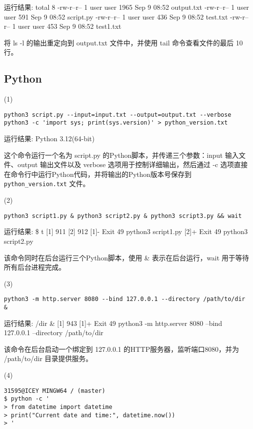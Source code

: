 \documentclass[a4paper, 12pt]{article}
\begin{document}
运行结果:
{\color{blue}
total 8
-rw-r--r-- 1 user user 1965 Sep  9 08:52 output.txt
-rw-r--r-- 1 user user  591 Sep  9 08:52 script.py
-rw-r--r-- 1 user user  436 Sep  9 08:52 test.txt
-rw-r--r-- 1 user user  453 Sep  9 08:52 test1.txt
}

将 ls -l 的输出重定向到 output.txt 文件中，并使用 tail 命令查看文件的最后 10 行。

\subsection{Python}
(1)\begin{verbatim}
python3 script.py --input=input.txt --output=output.txt --verbose
python3 -c 'import sys; print(sys.version)' > python_version.txt
\end{verbatim}

运行结果:
{\color{blue}
Python 3.12(64-bit)
}

这个命令运行一个名为 script.py 的Python脚本，并传递三个参数：input 输入文件、output 输出文件以及 verbose 选项用于控制详细输出，然后通过 -c 选项直接在命令行中运行Python代码，并将输出的Python版本号保存到 \texttt{python\_version.txt} 文件。

(2)\begin{verbatim}
python3 script1.py & python3 script2.py & python3 script3.py && wait
\end{verbatim}

运行结果:
{\color{blue}
\$ t
[1] 911
[2] 912
[1]-  Exit 49                 python3 script1.py
[2]+  Exit 49                 python3 script2.py
}

该命令同时在后台运行三个Python脚本，使用 \& 表示在后台运行，wait 用于等待所有后台进程完成。

(3)\begin{verbatim}
python3 -m http.server 8080 --bind 127.0.0.1 --directory /path/to/dir &
\end{verbatim}

运行结果:
{\color{blue}
/dir \&
[1] 943
[1]+  Exit 49                 python3 -m http.server 8080 --bind 127.0.0.1 --directory /path/to/dir
}

该命令在后台启动一个绑定到 127.0.0.1 的HTTP服务器，监听端口8080，并为 /path/to/dir 目录提供服务。

(4)\begin{verbatim}
31595@ICEY MINGW64 / (master)
$ python -c '
> from datetime import datetime
> print("Current date and time:", datetime.now())
> '
\end{verbatim}
\end{document}
